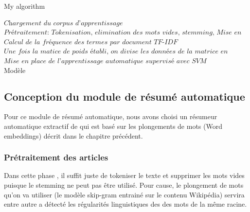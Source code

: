 \begin{algorithm}
	\caption{My algorithm}\label{euclid}
	\begin{algorithmic}[1]
		
		\State $\textit{Chargement du corpus d'apprentissage}$\\
		\State $\textit{Prétraitement: Tokenisation, elimination des mots vides, stemming, Mise en place des ngrammes}$\\
		\State $\textit{Calcul de la fréquence des termes par document TF-IDF}$\\
		\State $\textit{Une fois la matice de poids établi, on divise les données de la matrice en données d'apprentissage et données de tests}$\\
		\State $\textit{Mise en place de l'apprentissage automatique supervisé avec SVM}$\\
		\Return Modèle
		
		\EndProcedure
		
	\end{algorithmic}
\end{algorithm}


\subsection{Conception du module de résumé automatique}
Pour ce module de résumé automatique, nous avons choisi un résumeur automatique extractif de \cite{ffff} qui est basé sur les plongements de mots (Word embeddings) décrit dans le chapitre précédent.

\subsubsection{Prétraitement des articles}
Dans cette phase , il suffit juste de tokeniser le texte et supprimer les mots vides puisque le stemming ne peut pas être utilisé. Pour cause, le plongement de mots qu'on va utiliser (le modèle skip-gram entrainé sur le contenu Wikipédia) servira entre autre a détecté les régularités linguistiques des des mots de la même racine.



